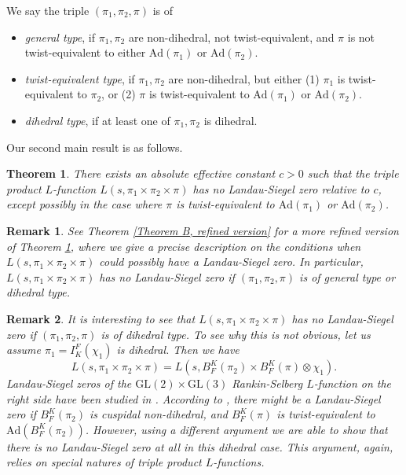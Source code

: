 \documentclass[12pt]{amsart}
\newcommand{\Ad}{\text{Ad}}
\newcommand{\GL}{\text{GL}}
\newtheorem{remark}{Remark}[section]
\newtheorem{thmx}{Theorem}
\begin{document}
We say the triple $(\pi_1,\pi_2,\pi)$ is of 
\begin{itemize}
    \item \textit{general type}, if $\pi_1,\pi_2$ are non-dihedral, not twist-equivalent, and $\pi$ is not twist-equivalent to either $\Ad(\pi_1)$ or $\Ad(\pi_2)$.
    \item \textit{twist-equivalent type}, if $\pi_1,\pi_2$ are non-dihedral, but either (1) $\pi_1$ is twist-equivalent to $\pi_2$, or (2) $\pi$ is twist-equivalent to $\Ad(\pi_1)$ or $\Ad(\pi_2)$.
    \item \textit{dihedral type}, if at least one of $\pi_1,\pi_2$ is dihedral.
\end{itemize}

Our second main result is as follows.


\begin{thmx}\label{Theorem B}
    There exists an absolute effective constant $c>0$ such that the triple product $L$-function $L(s,\pi_1 \times \pi_2 \times \pi)$ has no Landau-Siegel zero relative to $c$, except possibly in the case where $\pi$ is twist-equivalent to $\Ad(\pi_1)$ or $\Ad(\pi_2)$.
\end{thmx}


\begin{remark}
    See Theorem \ref{Theorem B, refined version} for a more refined version of Theorem \ref{Theorem B}, where we give a precise description on the conditions when $L(s,\pi_1 \times \pi_2 \times \pi)$ could possibly have a Landau-Siegel zero. In particular, $L(s,\pi_1 \times \pi_2 \times \pi)$ has no Landau-Siegel zero if $(\pi_1,\pi_2,\pi)$ is of general type or dihedral type.
\end{remark}

\begin{remark}
    It is interesting to see that $L(s,\pi_1 \times \pi_2 \times \pi)$ has no Landau-Siegel zero if $(\pi_1,\pi_2,\pi)$ is of dihedral type. To see why this is not obvious, let us assume $\pi_1 = I_K^F(\chi_1)$ is dihedral. Then we have 
    \begin{equation*}
        L(s,\pi_1 \times \pi_2 \times \pi) = L(s,B_F^K(\pi_2) \times B_F^K(\pi) \otimes \chi_1).
    \end{equation*}
    Landau-Siegel zeros of the $\GL(2) \times \GL(3)$ Rankin-Selberg $L$-function on the right side have been studied in \cite{Luo2023}. According to \cite[Theorem 2]{Luo2023}, there might be a Landau-Siegel zero if $B_F^K(\pi_2)$ is cuspidal non-dihedral, and $B_F^K(\pi)$ is twist-equivalent to $\Ad(B_F^K(\pi_2))$. However, using a different argument we are able to show that there is no Landau-Siegel zero at all in this dihedral case. This argument, again, relies on special natures of triple product $L$-functions.
\end{remark}
\end{document}

